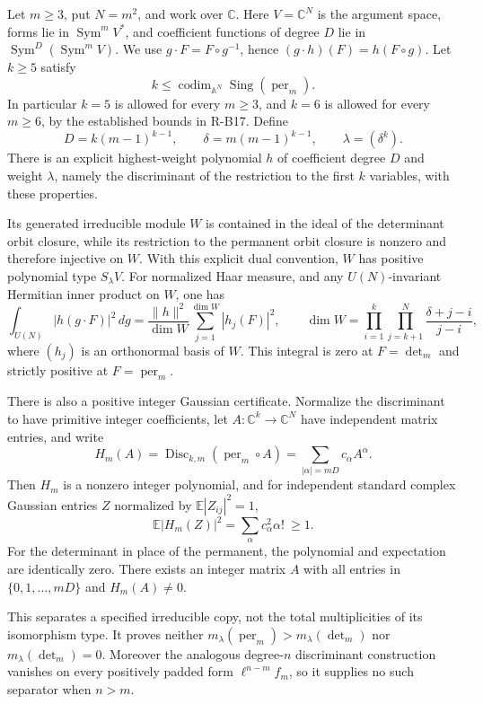\begin{theorem}
Let $m\geq3$, put $N=m^2$, and work over $\mathbb C$.
Here $V=\mathbb C^N$ is the argument space, forms lie in
$\operatorname{Sym}^m V^*$, and coefficient functions of degree
$D$ lie in $\operatorname{Sym}^D(\operatorname{Sym}^m V)$.
We use $g\cdot F=F\circ g^{-1}$, hence
$(g\cdot h)(F)=h(F\circ g)$.
Let $k\geq5$ satisfy
\[
 k\leq \operatorname{codim}_{\mathbb A^N}
                 \operatorname{Sing}(\operatorname{per}_m).
\]
In particular $k=5$ is allowed for every $m\geq3$, and $k=6$
is allowed for every $m\geq6$, by the established bounds in R-B17.
Define
\[
 D=k(m-1)^{k-1},\qquad \delta=m(m-1)^{k-1},\qquad
 \lambda=(\delta^k).
\]
There is an explicit highest-weight polynomial $h$ of coefficient
degree $D$ and weight $\lambda$, namely the discriminant of the
restriction to the first $k$ variables, with these properties.

Its generated irreducible module $W$ is contained in the ideal of
the determinant orbit closure, while its restriction to the
permanent orbit closure is nonzero and therefore injective on $W$.
With this explicit dual convention, $W$ has positive polynomial
type $S_\lambda V$. For normalized Haar measure, and any
$U(N)$-invariant Hermitian inner product on $W$, one has
\begin{equation}\label{G19:Haar}
 \int_{U(N)}|h(g\cdot F)|^2\,dg
   =\frac{\|h\|^2}{\dim W}\sum_{j=1}^{\dim W}|h_j(F)|^2,
 \qquad
 \dim W=\prod_{i=1}^k\prod_{j=k+1}^{N}
                     \frac{\delta+j-i}{j-i},
\end{equation}
where $(h_j)$ is an orthonormal basis of $W$.
This integral is zero at $F=\det_m$ and strictly positive at
$F=\operatorname{per}_m$.

There is also a positive integer Gaussian certificate. Normalize
the discriminant to have primitive integer coefficients, let
$A:\mathbb C^k\longrightarrow\mathbb C^N$ have independent
matrix entries, and write
\[
 H_m(A)=\operatorname{Disc}_{k,m}(\operatorname{per}_m\circ A)
        =\sum_{|\alpha|=mD}c_\alpha A^\alpha.
\]
Then $H_m$ is a nonzero integer polynomial, and for independent
standard complex Gaussian entries $Z$ normalized by
$\mathbb E|Z_{ij}|^2=1$,
\begin{equation}\label{G19:Gaussian}
 \mathbb E|H_m(Z)|^2=\sum_\alpha c_\alpha^2\alpha!\ \geq1.
\end{equation}
For the determinant in place of the permanent, the polynomial
and expectation are identically zero. There exists an integer
matrix $A$ with all entries in $\{0,1,\ldots,mD\}$ and
$H_m(A)\ne0$.

This separates a specified irreducible copy, not the total
multiplicities of its isomorphism type. It proves neither
$m_\lambda(\operatorname{per}_m)>m_\lambda(\det_m)$ nor
$m_\lambda(\det_m)=0$. Moreover the analogous degree-$n$
discriminant construction vanishes on every positively padded
form $\ell^{n-m}f_m$, so it supplies no such separator when
$n>m$.
\end{theorem}

